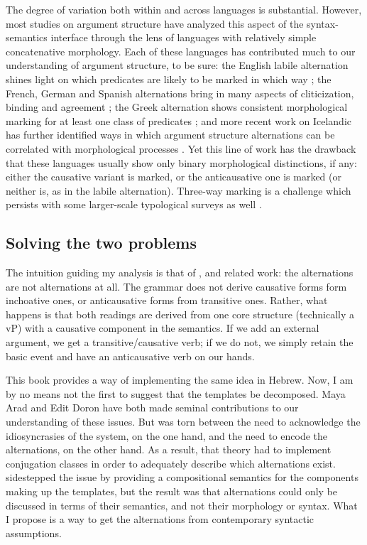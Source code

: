 The degree of variation both within and across languages is substantial. However, most studies on argument structure have analyzed this aspect of the syntax-semantics interface through the lens of languages with relatively simple concatenative morphology. Each of these languages has contributed much to our understanding of argument structure, to be sure: the English labile alternation shines light on which predicates are likely to be marked in which way \citep{haspelmath93,unaccusativity95,koontzgarboden09}; the French, German and Spanish alternations bring in many aspects of cliticization, binding and agreement \citep{labelle08,schaefer08,cuervo14}; the Greek alternation shows consistent morphological marking for at least one class of predicates \citep{alexiadoudoron12,layering15}; and more recent work on Icelandic has further identified ways in which argument structure alternations can be correlated with morphological processes \citep{wood14nllt,wood15springer,wood16roots}. Yet this line of work has the drawback that these languages usually show only binary morphological distinctions, if any: either the causative variant is marked, or the anticausative one is marked (or neither is, as in the labile alternation). Three-way marking is a challenge which persists with some larger-scale typological surveys as well \citep{haspelmath93,arad05}.

	\subsection{Solving the two problems}
The intuition guiding my analysis is that of \cite{schaefer08}, \cite{layering15} and related work: the alternations are not alternations at all. The grammar does not derive causative forms form inchoative ones, or anticausative forms from transitive ones. Rather, what happens is that both readings are derived from one core structure (technically a vP) with a causative component in the semantics. If we add an external argument, we get a transitive/causative verb; if we do not, we simply retain the basic event and have an anticausative verb on our hands.

This book provides a way of implementing the same idea in Hebrew. Now, I am by no means not the first to suggest that the templates be decomposed. Maya Arad and Edit Doron have both made seminal contributions to our understanding of these issues. But \cite{arad05} was torn between the need to acknowledge the idiosyncrasies of the system, on the one hand, and the need to encode the alternations, on the other hand. As a result, that theory had to implement conjugation classes in order to adequately describe which alternations exist. \cite{doron03} sidestepped the issue by providing a compositional semantics for the components making up the templates, but the result was that alternations could only be discussed in terms of their semantics, and not their morphology or syntax. What I propose is a way to get the alternations from contemporary syntactic assumptions.

